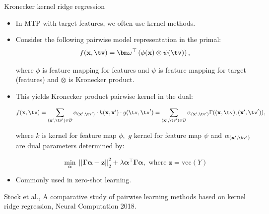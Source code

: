 \documentclass[11pt,compress,t,notes=noshow, xcolor=table]{beamer}
\begin{document}



\sloppy



\begin{frame}{Kronecker kernel ridge regression}
	\begin{itemize}

    	\item In MTP with target features, we often use kernel methods.
    
    	\item Consider the following pairwise model representation in the primal: 
    		\begin{equation*}
    			\label{eq:pairwise}
    			f(\xv,\tv) = \bm\omega^\top \left(\phi(\xv) \otimes \psi(\tv) \right) ,
    		\end{equation*}
    
    	where $\phi$ is feature mapping for features and $\psi$ is feature mapping for target (features) and $\otimes$ is Kronecker product. 
    
    	\item This yields Kronecker product pairwise kernel in the dual:
    	
    	\begin{eqnarray*} 
    		f(\xv,\tv)= \sum_{(\xv',\tv') \in \D} \alpha_{(\xv',\tv')}  \cdot  k(\xv,\xv') \cdot g(\tv,\tv')  = \sum_{(\xv',\tv') \in \D} \alpha_{(\xv',\tv')} \Gamma((\xv,\tv),(\xv',\tv')),
    	\end{eqnarray*}
    
    	where $k$ is kernel for feature map $\phi,$  $g$ kernel for feature map $\psi$  and $\alpha_{(\xv',\tv')}$ are dual parameters determined by:
    
    	$$ \min_{\bm{\alpha}} \, ||\bm{\Gamma}\bm{\alpha} -\bm{z} ||^2_2 +\lambda\bm{\alpha }^\top \bm{\Gamma}\bm{\alpha}, \text{ where } \bm{z} = \mathrm{vec}{(Y)}$$
    
    
    
    	\item Commonly used in zero-shot learning.

\end{itemize}

	{\tiny Stock et al., A comparative study of pairwise learning methods based on kernel ridge regression, Neural Computation 2018.}
%	
\end{frame}
\end{document}
